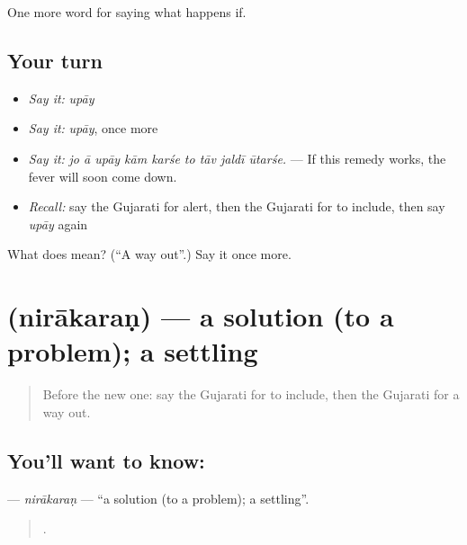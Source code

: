 \begin{grammarlens}[title={What you've built}]
One more word for saying what happens if.
\end{grammarlens}

\subsection*{Your turn}
\begin{itemize}
\raggedright
  \item \emph{Say it:} \emph{upāy}
  \item \emph{Say it:} \emph{upāy}, once more
  \item \emph{Say it:} \emph{jo ā upāy kām karśe to tāv jaldī ūtarśe.} — If this remedy works, the fever will soon come down.
  \item \emph{Recall:} say the Gujarati for alert, then the Gujarati for to include, then say \emph{upāy} again
\end{itemize}

\begin{tcolorbox}[breakable,colback=teal!4,colframe=teal!35!black,title={Before you move on}]
What does  mean? (\textquotedblleft{}A way out\textquotedblright{}.) Say it once more.
\end{tcolorbox}
\section[\texorpdfstring{\gu{નિરાકરણ} (nirākaraṇ)}{નિરાકરણ (nirākaraṇ)}]{ (nirākaraṇ) — a solution (to a problem); a settling}

\label{lesson:GU-C373-nirakaran}



\begin{quote}
Before the new one: say the Gujarati for to include, then the Gujarati for a way out.
\end{quote}

\subsection*{You'll want to know: }
\textbf{} — \emph{nirākaraṇ} — \textquotedblleft{}a solution (to a problem); a settling\textquotedblright{}.

\begin{quote}
         .
\end{quote}

